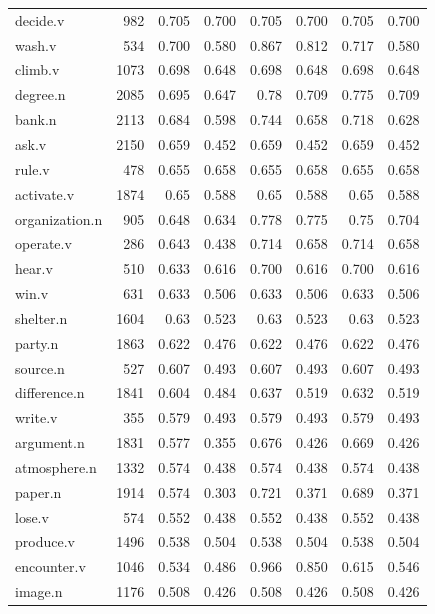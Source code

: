\documentclass{article}
\begin{document}
\begin{longtable}{l | r r r r r r r}
decide.v    	&	982 	&	0.705	&	0.700	&	0.705	&	0.700	&	0.705	&	0.700\\
wash.v      	&	534 	&	0.700	&	0.580	&	0.867	&	0.812	&	0.717	&	0.580\\
climb.v     	&	1073	&	0.698	&	0.648	&	0.698	&	0.648	&	0.698	&	0.648\\
degree.n    	&	2085	&	0.695	&	0.647	&	0.78	&	0.709	&	0.775	&	0.709\\
bank.n      	&	2113	&	0.684	&	0.598   &	0.744	&	0.658	&	0.718	&	0.628\\
ask.v       	&	2150	&	0.659	&	0.452	&	0.659	&	0.452	&	0.659	&	0.452\\
rule.v      	&	478 	&	0.655	&	0.658	&	0.655	&	0.658	&	0.655	&	0.658\\
activate.v    	&	1874	&	0.65	&	0.588	&	0.65	&	0.588	&	0.65	&	0.588\\
organization.n	&	905 	&	0.648	&	0.634	&	0.778	&	0.775	&	0.75	&	0.704\\
operate.v    	&	286 	&	0.643	&	0.438	&	0.714	&	0.658	&	0.714	&	0.658\\
hear.v      	&	510 	&	0.633	&	0.616	&	0.700	&	0.616	&	0.700	&	0.616\\
win.v       	&	631 	&	0.633	&	0.506	&	0.633	&	0.506	&	0.633	&	0.506\\
shelter.n    	&	1604	&	0.63	&	0.523	&	0.63	&	0.523	&	0.63	&	0.523\\
party.n     	&	1863	&	0.622	&	0.476	&	0.622	&	0.476	&	0.622	&	0.476\\
source.n    	&	527 	&	0.607	&	0.493	&	0.607	&	0.493	&	0.607	&	0.493\\
difference.n	&	1841	&	0.604	&	0.484	&	0.637	&	0.519	&	0.632	&	0.519\\
write.v     	&	355 	&	0.579	&	0.493	&	0.579	&	0.493	&	0.579	&	0.493\\
argument.n    	&	1831	&	0.577	&	0.355   &	0.676	&	0.426	&	0.669	&	0.426\\
atmosphere.n	&	1332	&	0.574	&	0.438	&	0.574	&	0.438	&	0.574	&	0.438\\
paper.n     	&	1914	&	0.574	&	0.303	&	0.721	&	0.371	&	0.689	&	0.371\\
lose.v      	&	574 	&	0.552	&	0.438	&	0.552	&	0.438	&	0.552	&	0.438\\
produce.v    	&	1496	&	0.538	&	0.504	&	0.538	&	0.504	&	0.538	&	0.504\\
encounter.v    	&	1046	&	0.534	&	0.486	&	0.966	&	0.850	&	0.615	&	0.546\\
image.n     	&	1176	&	0.508	&	0.426	&	0.508	&	0.426	&	0.508	&	0.426\\

\end{longtable}
\end{document}
